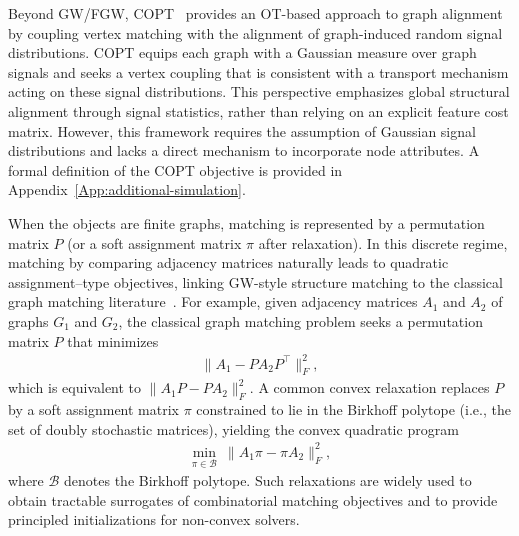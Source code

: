 \documentclass{article}
\theoremstyle{plain}
\theoremstyle{definition}
\theoremstyle{remark}
\begin{document}
Beyond GW/FGW, COPT~\citep{dong2020copt} provides an OT-based approach to graph alignment by coupling vertex matching with the alignment of graph-induced random signal distributions. COPT equips each graph with a Gaussian measure over graph signals and seeks a vertex coupling that is consistent with a transport mechanism acting on these signal distributions. This perspective emphasizes global structural alignment through signal statistics, rather than relying on an explicit feature cost matrix. However, this framework requires the assumption of Gaussian signal distributions and lacks a direct mechanism to incorporate node attributes. A formal definition of the COPT objective is provided in Appendix~\ref{App:additional-simulation}.

When the objects are finite graphs, matching is represented by a permutation matrix $P$ (or a soft assignment matrix $\pi$ after relaxation). In this discrete regime, matching by comparing adjacency matrices naturally leads to quadratic assignment--type objectives, linking GW-style structure matching to the classical graph matching literature~\citep{zaslavskiy2008path,ravikumar2006quadratic,aflalo2015convex,schellewald2007evaluation,schellewald2005probabilistic,swoboda2019convex}. For example, given adjacency matrices $A_1$ and $A_2$ of graphs $G_1$ and $G_2$, the classical graph matching problem seeks a permutation matrix $P$ that minimizes
\begin{align*}
	\| A_1 - P A_2 P^\top \|_F^2,
	\end{align*}
which is equivalent to $\|A_1P - PA_2 \|_F^2$. A common convex relaxation replaces $P$ by a soft assignment matrix $\pi$ constrained to lie in the Birkhoff polytope (i.e., the set of doubly stochastic matrices), yielding the convex quadratic program
\begin{align*}
	\min_{\pi \in \mathcal{B}} \ \|A_1\pi - \pi A_2 \|_F^2,
	\end{align*}
where $\mathcal{B}$ denotes the Birkhoff polytope. Such relaxations are widely used to obtain tractable surrogates of combinatorial matching objectives and to provide principled initializations for non-convex solvers.
\end{document}
